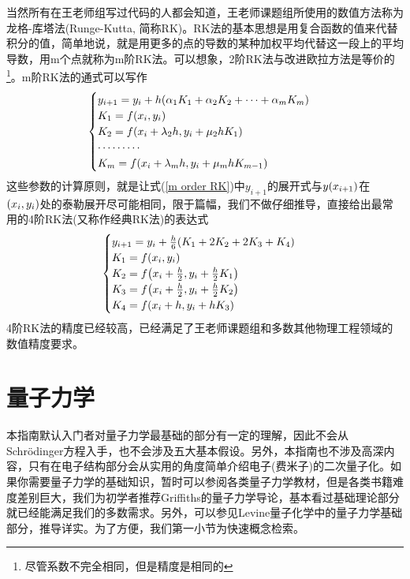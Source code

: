 \documentclass[12pt,a4paper,openany,twoside]{book}
\numberwithin{equation}{section}
\newcommand{\sch}{Schr\"odinger}
\begin{document}
          当然所有在王老师组写过代码的人都会知道，王老师课题组所使用的数值方法称为龙格-库塔法(Runge-Kutta, 简称RK)。RK法的基本思想是用复合函数的值来代替积分的值，简单地说，就是用更多的点的导数的某种加权平均代替这一段上的平均导数，用m个点就称为m阶RK法。可以想象，2阶RK法与改进欧拉方法是等价的\footnote{尽管系数不完全相同，但是精度是相同的}。m阶RK法的通式可以写作
          \begin{equation}
            \begin{cases}
              y_{i+1}=y_i+h\qty(\alpha_1 K_1+\alpha_2 K_2+\cdots+\alpha_m K_m)\\
              K_1=f\qty(x_i, y_i)\\
              K_2=f\qty(x_i+\lambda_2 h, y_i+\mu_2 h K_1)\\
              \cdots\cdots\cdots\\
              K_m=f\qty(x_i+\lambda_m h, y_i+\mu_m h K_{m-1})
            \end{cases}
            \label{m order RK}
          \end{equation}
          这些参数的计算原则，就是让式(\ref{m order RK})中$y_{i+1}$的展开式与$y\qty(x_{i+1})$在$\qty(x_i,y_i)$处的泰勒展开尽可能相同，限于篇幅，我们不做仔细推导，直接给出最常用的4阶RK法(又称作经典RK法)的表达式
          \begin{equation}
            \begin{cases}
              y_{i+1}=y_i+\frac{h}{6}\qty(K_1+2K_2+2K_3+K_4)\\
              K_1=f\qty(x_i,y_i)\\
              K_2=f\qty(x_i+\frac{h}{2},y_i+\frac{h}{2}K_1) \\
              K_3=f\qty(x_i+\frac{h}{2},y_i+\frac{h}{2}K_2) \\
              K_4=f\qty(x_i+h, y_i+hK_3)
            \end{cases}
            \label{4 order RK}
          \end{equation}
          4阶RK法的精度已经较高，已经满足了王老师课题组和多数其他物理工程领域的数值精度要求。

    \chapter{量子力学}
      本指南默认入门者对量子力学最基础的部分有一定的理解，因此不会从\sch 方程入手，也不会涉及五大基本假设。另外，本指南也不涉及高深内容，只有在电子结构部分会从实用的角度简单介绍电子(费米子)的二次量子化。如果你需要量子力学的基础知识，暂时可以参阅各类量子力学教材，但是各类书籍难度差别巨大，我们为初学者推荐Griffiths的量子力学导论，基本看过基础理论部分就已经能满足我们的多数需求。另外，可以参见Levine量子化学中的量子力学基础部分，推导详实。为了方便，我们第一小节为快速概念检索。
\end{document}
